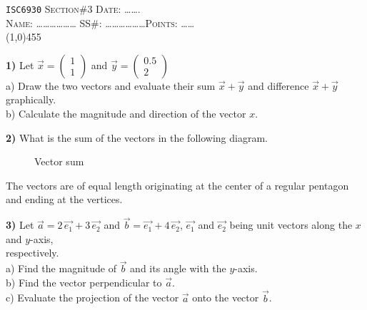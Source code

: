 \documentclass[11pt]{article}
\begin{document}
\begin{flushleft}
\large \verb"ISC6930"\hspace{5.1cm} \textsc{Section}\#3  \hspace{4.cm} \textsc{Date:} \ldots\ldots. \\
\vspace*{.3cm} \large \textsc{Name:}
\ldots\ldots\ldots\ldots\ldots\ldots\hspace{1.85cm} SS\#:
\ldots\ldots\ldots\ldots\ldots\ldots\hspace{2cm}\textsc{Points:} \ldots\ldots\\
\line(1,0){455}
\end{flushleft}

\normalsize
\textbf{1)} Let $ \vec{x} = \left( \begin{array}{c} 1 \\ 1 \end{array} \right)$ 
            and $ \vec{y} = \left( \begin{array}{c} 0.5 \\ 2  \end{array} \right)$ \svs \\ \svs
\hspace*{5mm} a) Draw the two vectors and evaluate their sum $\vec{x}+\vec{y}$ and 
                        difference $\vec{x}+\vec{y}$ graphically.\\
\hspace*{5mm} b) Calculate the magnitude and direction of the vector $x$. \vs

\textbf{2)} What is the sum of the vectors in the following diagram. \svs

\begin{figure}[!ht]
   \centerline{\epsfxsize=6cm  } \svs
   \caption{Vector sum} \label{fig2}
\end{figure} \svs

The vectors are of equal length originating at the center of a
regular pentagon and ending at the vertices. \vs

\textbf{3)} Let $\vec{a} = 2\,\vec{e_1} + 3\,\vec{e_2}$ and $\vec{b} = \vec{e_1} + 4\,\vec{e_2}$, 
$\vec{e_1}$ and $\vec{e_2}$ being unit vectors along the $x$ and $y$-axis, \\
\hspace*{4mm} respectively. \svs \\ \svs
\hspace{5mm} a) Find the magnitude of $\vec{b}$ and its angle with the $y$-axis. \\ \svs
\hspace{5mm} b) Find the vector perpendicular to $\vec{a}$. \\ \vs
\hspace{5mm} c) Evaluate the projection of the vector $\vec{a}$ onto the vector $\vec{b}$. 
\end{document}
